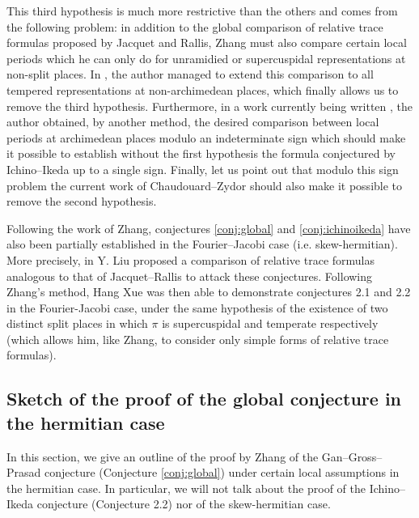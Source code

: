 This third hypothesis is much more restrictive than the others and comes from the following problem: in addition to the global comparison of relative trace formulas proposed by Jacquet and Rallis, Zhang must also compare certain local periods which he can only do for unramidied or supercuspidal representations at non-split places.
In \cite{beuzart2021comparison}, the author managed to extend this comparison to all tempered representations at non-archimedean places, which finally allows us to remove the third hypothesis.
Furthermore, in a work currently being written \cite{beuzart2017factorisations}, the author obtained, by another method, the desired comparison between local periods at archimedean places modulo an indeterminate sign which should make it possible to establish without the first hypothesis the formula conjectured by Ichino--Ikeda up to a single sign.
Finally, let us point out that modulo this sign problem the current work of Chaudouard--Zydor should also make it possible to remove the second hypothesis.

Following the work of Zhang, conjectures \ref{conj:global} and \ref{conj:ichinoikeda} have also been partially established in the Fourier--Jacobi case (i.e. skew-hermitian).
More precisely, in \cite{liu2014relative} Y. Liu proposed a comparison of relative trace formulas analogous to that of Jacquet--Rallis to attack these conjectures.
Following Zhang's method, Hang Xue \cite{xue2014gan,xue2016fourier,xue2017fourier} was then able to demonstrate conjectures 2.1 and 2.2 in the Fourier-Jacobi case, under the same hypothesis of the existence of two distinct split places in which $\pi$ is supercuspidal and temperate respectively (which allows him, like Zhang, to consider only simple forms of relative trace formulas).


\subsection{Sketch of the proof of the global conjecture in the hermitian case}


In this section, we give an outline of the proof by Zhang \cite{zhang2014fourier} of the Gan--Gross--Prasad conjecture (Conjecture \ref{conj:global}) under certain local assumptions in the hermitian case.
In particular, we will not talk about the proof of the Ichino--Ikeda conjecture (Conjecture 2.2) nor of the skew-hermitian case.

